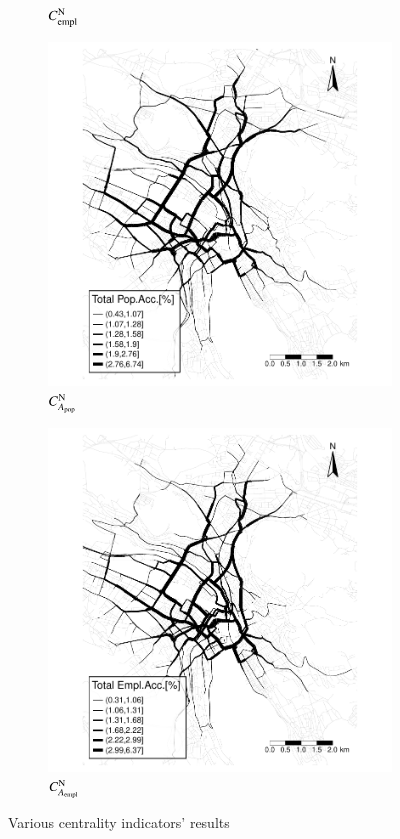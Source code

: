 \documentclass[]{elsarticle} %
\begin{document}
\begin{figure}
\begin{subfigure}{.5\textwidth}
  \caption{$C_{\rm empl}^{\rm N}$}
\end{subfigure}
\begin{subfigure}{.5\textwidth}
  \centering
  \includegraphics[width=1\linewidth]{Plots/pop_acc_center.pdf}  
  \caption{$C_{A_{\rm pop}}^{\rm N}$}
\end{subfigure}
\begin{subfigure}{.5\textwidth}
  \centering
  \includegraphics[width=1\linewidth]{Plots/empl_acc_center.pdf}  
  \caption{$C_{A_{\rm empl}}^{\rm N}$}
\end{subfigure}
\caption{Various centrality indicators' results}
  \label{centralities}
\end{figure}
\end{document}
